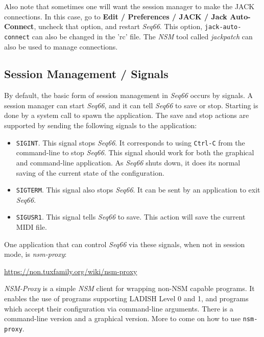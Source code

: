    Also note that sometimes one will want the session manager to make the JACK
   connections.  In this case, go to
   \textbf{Edit / Preferences / JACK / Jack Auto-Connect}, uncheck that option,
   and restart \textsl{Seq66}.
   This option, \texttt{jack-auto-connect}
   can also be changed in the 'rc' file.
   The \textsl{NSM} tool called \textsl{jackpatch} can also be used to manage
   connections.

\subsection{Session Management / Signals}
\label{subsec:sessions_signals}

   By default, the basic form of session management in
   \textsl{Seq66} occurs by signals.  A
   session manager can start \textsl{Seq66}, and it can tell \textsl{Seq66} to
   save or stop.  Starting is done by a system call to spawn the application.
   The save and stop actions are supported by sending the following signals to
   the application:

   \begin{itemize}
      \item \texttt{SIGINT}.
         This signal stops \textsl{Seq66}. It corresponds
         to using \texttt{Ctrl-C} from the command-line to stop \textsl{Seq66}.
         This signal should work for both the graphical and command-line
         application.  As \textsl{Seq66} shuts down, it does its normal saving
         of the current state of the configuration.
      \item \texttt{SIGTERM}.
         This signal also stops \textsl{Seq66}.  It can
         be sent by an application to exit \textsl{Seq66}.
      \item \texttt{SIGUSR1}.
         This signal tells \textsl{Seq66} to save.  This
         action will save the current MIDI file.
   \end{itemize}

   One application that can control \textsl{Seq66} via these signals, when not
   in session mode, is \textsl{nsm-proxy}:

      \url{https://non.tuxfamily.org/wiki/nsm-proxy}

   \textsl{NSM-Proxy} is a simple \textsl{NSM} client for wrapping non-NSM
   capable programs. It enables the use of programs supporting LADISH Level 0
   and 1, and programs which accept their configuration via command-line
   arguments.  There is a command-line version and a graphical version.
   More to come on how to use \texttt{nsm-proxy}.

